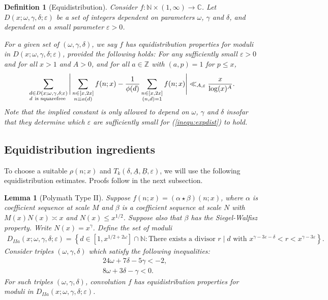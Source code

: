 \documentclass{amsart}
\newtheorem{lemma}{Lemma}
\newtheorem{defn}{Definition}
\numberwithin{equation}{section}
\begin{document}
\begin{defn}[Equidistribution]\label{def:expdist}
Consider  $f: \mathbb{N} \times (1,\infty) \rightarrow \mathbb{C}$. Let $D(x;\omega,\gamma,\delta; \varepsilon)$ be a set of integers dependent on  parameters $\omega$, $\gamma$  and $\delta$, and dependent on a small parameter $\varepsilon>0$. 

For a given set of $(\omega,\gamma,\delta)$, we say $f$ has equidistribution properties for moduli in $D(x;\omega,\gamma,\delta;\varepsilon)$, provided  the following holds:  For any sufficiently small $\varepsilon >0$ and for all $x>1$  and  $A>0$,  and for all $a \in \mathbb{Z}$ with $(a,p)=1$ for $p \leq x$,
\begin{align}\label{inequ:expdist}
\sum_{\substack{ d \in D(x;\omega,\gamma,\delta;\varepsilon) \\  d \mbox{ \scriptsize  is squarefree  }  }} \Bigg| \sum_{\substack{n \in [x,2x] \\ n \equiv a (d)}} f(n;x) - \dfrac{1}{\phi(d)} \sum_{\substack{n \in [x,2x] \\(n,d)=1 }}f(n;x) \Bigg| \ll_{A,\varepsilon} \dfrac{x}{\log(x)^A}.
\end{align}
Note that the implied constant is only allowed to depend on $\omega$, $\gamma$ and $\delta$ insofar that they determine which $\varepsilon$ are sufficiently small for (\ref{inequ:expdist}) to hold.
\end{defn}



 

\subsection{Equidistribution ingredients} To choose a suitable $\rho(n;x)$ and $T_k(\delta,\underline{A},\underline{B},\varepsilon)$, we will use the following equidistribution estimates. Proofs follow in the next subsection.



\begin{lemma}[Polymath Type II] \label{lem:typeIIPoly} 
Suppose $f(n;x) = (\alpha \star \beta)(n;x)$, where $\alpha$ is  coefficient sequence at scale $M$ and $\beta$ is a  coefficient sequence at scale $N$ with $M(x) N(x) \asymp x$ and $N(x) \leq x^{1/2}$. Suppose also that $\beta$ has the Siegel-Walfisz property. Write $N(x) = x^\gamma$. Define the set of moduli
\begin{align*}
D_{IIa}(x;\omega,\gamma,\delta;\varepsilon) = \left\{d \in  [1, x^{1/2+2\omega}]\cap \mathbb{N}:  \mbox{There exists a divisor } r \mid d \mbox{ with } x^{\gamma -3\varepsilon-\delta} < r < x^{\gamma - 3\varepsilon} \right\}.
\end{align*}
Consider triples $(\omega,\gamma,\delta)$ which satisfy the following inequalities:
\begin{align*}
&24\omega + 7\delta -5\gamma <-2, \\
&8\omega + 3\delta -\gamma <0.
\end{align*}
For such triples  $(\omega,\gamma,\delta)$, convolution $f$ has equidistribution properties for moduli in $D_{IIa}(x;\omega,\gamma,\delta;\varepsilon)$.
\end{lemma}
\end{document}
